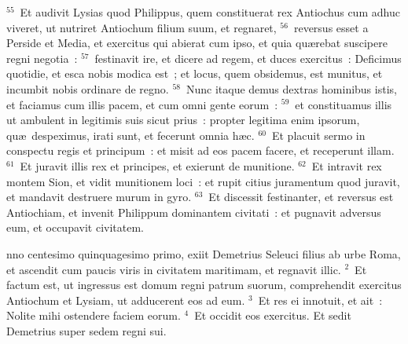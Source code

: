 ${}^{55}$~Et audivit Lysias quod Philippus, quem constituerat rex Antiochus cum adhuc viveret, ut nutriret Antiochum filium suum, et regnaret,
${}^{56}$~reversus esset a Perside et Media, et exercitus qui abierat cum ipso, et quia qu\ae rebat suscipere regni negotia~:
${}^{57}$~festinavit ire, et dicere ad regem, et duces exercitus~: Deficimus quotidie, et esca nobis modica est~; et locus, quem obsidemus, est munitus, et incumbit nobis ordinare de regno.
${}^{58}$~Nunc itaque demus dextras hominibus istis, et faciamus cum illis pacem, et cum omni gente eorum~:
${}^{59}$~et constituamus illis ut ambulent in legitimis suis sicut prius~: propter legitima enim ipsorum, qu\ae\ despeximus, irati sunt, et fecerunt omnia h\ae c.
${}^{60}$~Et placuit sermo in conspectu regis et principum~: et misit ad eos pacem facere, et receperunt illam.
${}^{61}$~Et juravit illis rex et principes, et exierunt de munitione.
${}^{62}$~Et intravit rex montem Sion, et vidit munitionem loci~: et rupit citius juramentum quod juravit, et mandavit destruere murum in gyro.
${}^{63}$~Et discessit festinanter, et reversus est Antiochiam, et invenit Philippum dominantem civitati~: et pugnavit adversus eum, et occupavit civitatem.

\bchapter
{}nno centesimo quinquagesimo primo, exiit Demetrius Seleuci filius ab urbe Roma, et ascendit cum paucis viris in civitatem maritimam, et regnavit illic.
${}^{2}$~Et factum est, ut ingressus est domum regni patrum suorum, comprehendit exercitus Antiochum et Lysiam, ut adducerent eos ad eum.
${}^{3}$~Et res ei innotuit, et ait~: Nolite mihi ostendere faciem eorum.
${}^{4}$~Et occidit eos exercitus. Et sedit Demetrius super sedem regni sui.


